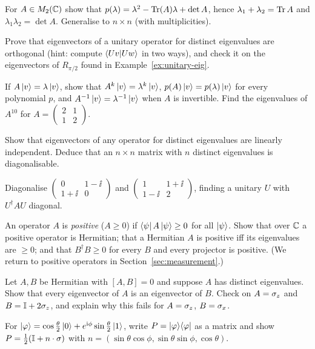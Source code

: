 \begin{exerciseset}
   For $A\in M_2(\mathbb{C})$ show that $p(\lambda)=\lambda^2-\operatorname{Tr}(A)\lambda+\det A$, hence $\lambda_1+\lambda_2=\operatorname{Tr} A$ and $\lambda_1\lambda_2=\det A$. Generalise to $n\times n$ (with multiplicities).

   Prove that eigenvectors of a unitary operator for distinct eigenvalues are orthogonal (hint: compute $\left\langle Uv\middle|Uw\right\rangle$ in two ways), and check it on the eigenvectors of $R_{\pi/2}$ found in Example~\ref{ex:unitary-eig}.

   If $A\left|v\right\rangle=\lambda\left|v\right\rangle$, show that $A^k\left|v\right\rangle=\lambda^k\left|v\right\rangle$, $p(A)\left|v\right\rangle=p(\lambda)\left|v\right\rangle$ for every polynomial $p$, and $A^{-1}\left|v\right\rangle=\lambda^{-1}\left|v\right\rangle$ when $A$ is invertible. Find the eigenvalues of $A^{10}$ for $A=\begin{pmatrix}2&1\\1&2\end{pmatrix}$.

   Show that eigenvectors of any operator for distinct eigenvalues are linearly independent. Deduce that an $n\times n$ matrix with $n$ distinct eigenvalues is diagonalisable.

   Diagonalise $\begin{pmatrix}0&1-\ii\\1+\ii&0\end{pmatrix}$ and $\begin{pmatrix}1&1+\ii\\1-\ii&2\end{pmatrix}$, finding a unitary $U$ with $U^\dagger AU$ diagonal.


   An operator $A$ is \emph{positive} ($A\ge0$) if $\left\langle\psi\right| A\left|\psi\right\rangle\ge0$ for all $\left|\psi\right\rangle$. Show that over $\mathbb{C}$ a positive operator is Hermitian; that a Hermitian $A$ is positive iff its eigenvalues are $\ge0$; and that $B^\dagger B\ge0$ for every $B$ and every projector is positive. (We return to positive operators in Section~\ref{sec:measurement}.)

   Let $A,B$ be Hermitian with $[A,B]=0$ and suppose $A$ has distinct eigenvalues. Show that every eigenvector of $A$ is an eigenvector of $B$. Check on $A=\sigma_z$ and $B=\mathbb{I}+2\sigma_z$, and explain why this fails for $A=\sigma_z$, $B=\sigma_x$.

   For $\left|\varphi\right\rangle=\cos\frac\theta2\left|0\right\rangle+e^{\mathrm{i}\phi}\sin\frac\theta2\left|1\right\rangle$, write $P=\left|\varphi\right\rangle\!\left\langle\varphi\right|$ as a matrix and show $P=\tfrac12(\mathbb{I}+n\cdot\sigma)$ with $n=(\sin\theta\cos\phi,\sin\theta\sin\phi,\cos\theta)$.


\end{exerciseset}
